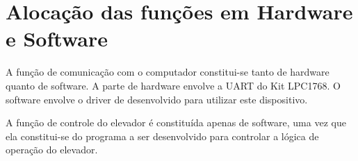 \section{Alocação das funções em Hardware e Software}

A função de comunicação com o computador constitui-se tanto de hardware quanto de software. A parte de hardware envolve a UART do Kit LPC1768. O software envolve o driver de desenvolvido para utilizar este dispositivo.

A função de controle do elevador é constituída apenas de software, uma vez que ela constitui-se do programa a ser desenvolvido para controlar a lógica de operação do elevador.




